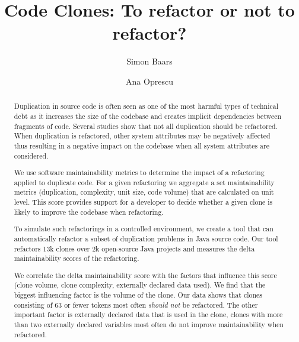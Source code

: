 \documentclass[sigconf,review,anonymous]{acmart}
\begin{document}
\title{Code Clones: To refactor or not to refactor?}

\author{Simon Baars}

\author{Ana Oprescu}

\begin{abstract}
Duplication in source code is often seen as one of the most harmful types of technical debt as it increases the size of the codebase and creates implicit dependencies between fragments of code. Several studies show that not all duplication should be refactored. When duplication is refactored, other system attributes may be negatively affected thus resulting in a negative impact on the codebase when all system attributes are considered.

We use software maintainability metrics to determine the impact of a refactoring applied to duplicate code. For a given refactoring we aggregate a set maintainability metrics (duplication, complexity, unit size, code volume) that are calculated on unit level. This score provides support for a developer to decide whether a given clone is likely to improve the codebase when refactoring. 

To simulate such refactorings in a controlled environment, we create a tool that can automatically refactor a subset of duplication problems in Java source code. Our tool refactors 13k clones over 2k open-source Java projects and measures the delta maintainability scores of the refactoring.

We correlate the delta maintainability score with the factors that influence this score (clone volume, clone complexity, externally declared data used). We find that the biggest influencing factor is the volume of the clone. Our data shows that clones consisting of 63 or fewer tokens most often \textit{should not} be refactored. The other important factor is externally declared data that is used in the clone, clones with more than two externally declared variables most often do not improve maintainability when refactored.

\end{abstract}
\end{document}
